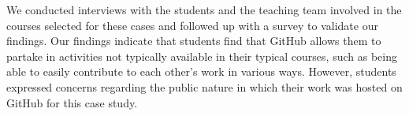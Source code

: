 We conducted interviews with the students and the teaching team involved in the courses selected for these cases and followed up with a survey to validate our findings. Our findings indicate that students find that GitHub allows them to partake in activities not typically available in their typical courses, such as being able to easily contribute to each other's work in various ways. However, students expressed concerns regarding the public nature in which their work was hosted on GitHub for this case study.



